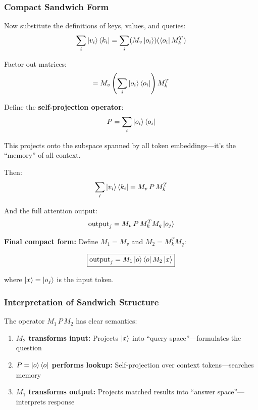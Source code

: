 \documentclass[11pt,a4paper]{article}
\theoremstyle{definition}
\begin{document}
\subsubsection{Compact Sandwich Form}

Now substitute the definitions of keys, values, and queries:
\begin{equation}
\sum_i \ket{v_i} \bra{k_i} = \sum_i (M_v \ket{o_i})(\bra{o_i} M_k^T)
\end{equation}

Factor out matrices:
\begin{equation}
= M_v \left(\sum_i \ket{o_i}\bra{o_i}\right) M_k^T
\end{equation}

Define the \textbf{self-projection operator}:
\begin{equation}
P = \sum_i \ket{o_i}\bra{o_i}
\end{equation}

This projects onto the subspace spanned by all token embeddings---it's the ``memory'' of all context.

Then:
\begin{equation}
\sum_i \ket{v_i} \bra{k_i} = M_v \, P \, M_k^T
\end{equation}

And the full attention output:
\begin{equation}
\text{output}_j = M_v \, P \, M_k^T M_q \ket{o_j}
\end{equation}

\textbf{Final compact form:} Define $M_1 = M_v$ and $M_2 = M_k^T M_q$:

\begin{equation}
\boxed{\text{output}_j = M_1 \ket{o}\bra{o} M_2 \ket{x}}
\end{equation}

where $\ket{x} = \ket{o_j}$ is the input token.

\subsubsection{Interpretation of Sandwich Structure}

The operator $M_1 \, P \, M_2$ has clear semantics:

\begin{enumerate}
\item \textbf{$M_2$ transforms input:} Projects $\ket{x}$ into ``query space''---formulates the question

\item \textbf{$P = \ket{o}\bra{o}$ performs lookup:} Self-projection over context tokens---searches memory

\item \textbf{$M_1$ transforms output:} Projects matched results into ``answer space''---interprets response
\end{enumerate}
\end{document}
